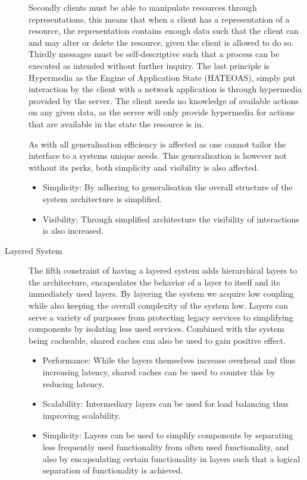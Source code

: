 \begin{description}
    Secondly clients must be able to manipulate resources through representations, this means that when a client has a representation of a resource, the representation contains enough data such that the client can and may alter or delete the resource, given the client is allowed to do so.
    Thirdly messages must be self-descriptive such that a process can be executed as intended without further inquiry.
    The last principle is Hypermedia as the Engine of Application State (HATEOAS), simply put interaction by the client with a network application is through hypermedia provided by the server.
    The client needs no knowledge of available actions on any given data, as the server will only provide hypermedia for actions that are available in the state the resource is in.

    As with all generalisation efficiency is affected as one cannot tailor the interface to a systems unique needs.
    This generalisation is however not without its perks, both simplicity and visibility is also affected.
    \begin{itemize}
        \item Simplicity: By adhering to generalisation the overall structure of the system architecture is simplified.
        \item Visibility: Through simplified architecture the visibility of interactions is also increased.
    \end{itemize}
    \item [Layered System]\label{layeredsystem}The fifth constraint of having a layered system adds hierarchical layers to the architecture, encapsulates the behavior of a layer to itself and its immediately used layers.
    By layering the system we acquire low coupling while also keeping the overall complexity of the system low.
    Layers can serve a variety of purposes from protecting legacy services to simplifying components by isolating less used services.
    Combined with the system being cacheable, shared caches can also be used to gain positive effect.
    \begin{itemize}
        \item Performance: While the layers themselves increase overhead and thus increasing latency, shared caches can be used to counter this by reducing latency.
        \item Scalability: Intermediary layers can be used for load balancing thus improving scalability.
        \item Simplicity: Layers can be used to simplify components by separating less frequently used functionality from often used functionality, and also by encapsulating certain functionality in layers such that a logical separation of functionality is achieved.

\end{itemize}
\end{description}

